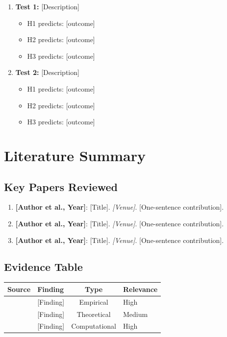 \documentclass[11pt,a4paper]{article}
\begin{document}
\begin{enumerate}
    \item \textbf{Test 1:} [Description]
    \begin{itemize}
        \item H1 predicts: [outcome]
        \item H2 predicts: [outcome]
        \item H3 predicts: [outcome]
    \end{itemize}
    \item \textbf{Test 2:} [Description]
    \begin{itemize}
        \item H1 predicts: [outcome]
        \item H2 predicts: [outcome]
        \item H3 predicts: [outcome]
    \end{itemize}
\end{enumerate}

\newpage
\section{Literature Summary}

\subsection*{Key Papers Reviewed}

\begin{enumerate}
    \item \textbf{[Author et al., Year]}: [Title]. \textit{[Venue]}. [One-sentence contribution].
    \item \textbf{[Author et al., Year]}: [Title]. \textit{[Venue]}. [One-sentence contribution].
    \item \textbf{[Author et al., Year]}: [Title]. \textit{[Venue]}. [One-sentence contribution].
\end{enumerate}

\subsection*{Evidence Table}

\begin{center}
\footnotesize
\begin{tabularx}{\textwidth}{lXcl}
\toprule
\textbf{Source} & \textbf{Finding} & \textbf{Type} & \textbf{Relevance} \\
\midrule
[Citation 1] & [Finding] & Empirical & High \\
[Citation 2] & [Finding] & Theoretical & Medium \\
[Citation 3] & [Finding] & Computational & High \\
\bottomrule
\end{tabularx}
\end{center}
\end{document}
